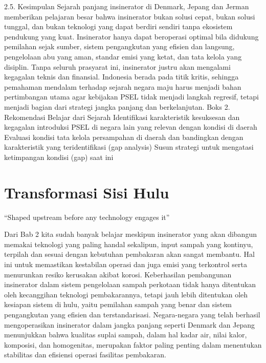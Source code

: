 \documentclass[
  letterpaper,
  DIV=11,
  numbers=noendperiod]{scrreprt}
\begin{document}
2.5. Kesimpulan Sejarah panjang insinerator di Denmark, Jepang dan
Jerman memberikan pelajaran besar bahwa insinerator bukan solusi cepat,
bukan solusi tunggal, dan bukan teknologi yang dapat berdiri sendiri
tanpa ekosistem pendukung yang kuat. Insinerator hanya dapat beroperasi
optimal bila didukung pemilahan sejak sumber, sistem pengangkutan yang
efisien dan langsung, pengelolaan abu yang aman, standar emisi yang
ketat, dan tata kelola yang disiplin. Tanpa seluruh prasyarat ini,
insinerator justru akan mengalami kegagalan teknis dan finansial.
Indonesia berada pada titik kritis, sehingga pemahaman mendalam terhadap
sejarah negara maju harus menjadi bahan pertimbangan utama agar
kebijakan PSEL tidak menjadi langkah regresif, tetapi menjadi bagian
dari strategi jangka panjang dan berkelanjutan. Boks 2. Rekomendasi
Belajar dari Sejarah Identifikasi karakteristik kesuksesan dan kegagalan
introduksi PSEL di negara lain yang relevan dengan kondisi di daerah
Evaluasi kondisi tata kelola persampahan di daerah dan bandingkan dengan
karakteristik yang teridentifikasi (gap analysis) Susun strategi untuk
mengatasi ketimpangan kondisi (gap) saat ini


\chapter{Transformasi Sisi Hulu}\label{transformasi-sisi-hulu}

``Shaped upstream before any technology engages it''

Dari Bab 2 kita sudah banyak belajar meskipun insinerator yang akan
dibangun memakai teknologi yang paling handal sekalipun, input sampah
yang kontinyu, terpilah dan sesuai dengan kebutuhan pembakaran akan
sangat membantu. Hal ini untuk memastikan kestabilan operasi dan juga
emisi yang terkontrol serta menurunkan resiko kerusakan akibat korosi.
Keberhasilan pembangunan insinerator dalam sistem pengelolaan sampah
perkotaan tidak hanya ditentukan oleh kecanggihan teknologi
pembakarannya, tetapi jauh lebih ditentukan oleh kesiapan sistem di
hulu, yaitu pemilahan sampah yang benar dan sistem pengangkutan yang
efisien dan terstandarisasi. Negara-negara yang telah berhasil
mengoperasikan insinerator dalam jangka panjang seperti Denmark dan
Jepang menunjukkan bahwa kualitas suplai sampah, dalam hal kadar air,
nilai kalor, komposisi, dan homogenitas, merupakan faktor paling penting
dalam menentukan stabilitas dan efisiensi operasi fasilitas pembakaran.
\end{document}
